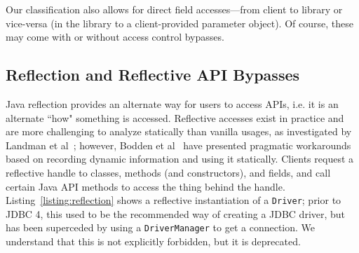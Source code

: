 


Our classification also allows for direct field accesses---from client to library or vice-versa (in the library to a client-provided parameter object). Of course, these may come with or without access control bypasses.

\subsection{Reflection and Reflective API Bypasses}
\label{ssec:api-usage-patterns:api-bypass}
Java reflection provides an alternate way for users to access APIs, i.e. it is an alternate ``how" something is accessed. Reflective accesses exist in practice and are more challenging to analyze statically than vanilla usages, as investigated by Landman et al~\cite{landman17:_chall_static_analy_java_reflec}; however, Bodden et al~\cite{bodden2011taming} have presented pragmatic workarounds based on recording dynamic information and using it statically. Clients request a reflective handle to classes, methods (and constructors), and fields, and call certain Java API methods to access the thing behind the handle. Listing~\ref{listing:reflection} shows a reflective instantiation of a \texttt{Driver}; prior to JDBC 4, this used to be the recommended way of creating a JDBC driver, but has been superceded by using a \texttt{DriverManager} to get a connection. We understand that this is not explicitly forbidden, but it is deprecated.





